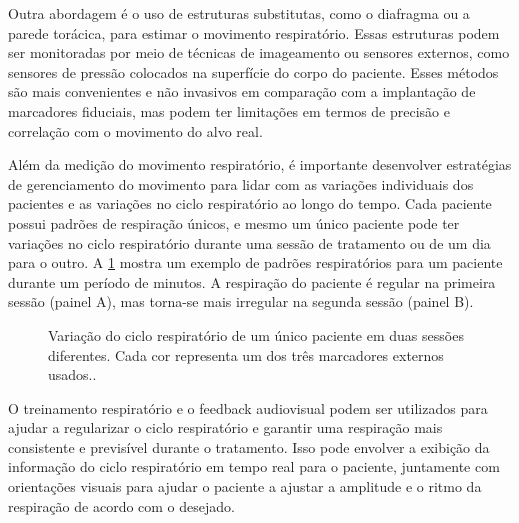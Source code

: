 \documentclass[11pt,a4paper]{article}
\newcounter{exemplo}
\begin{document}
	Outra abordagem é o uso de estruturas substitutas, como o diafragma ou a parede torácica, para estimar o movimento respiratório. Essas estruturas podem ser monitoradas por meio de técnicas de imageamento ou sensores externos, como sensores de pressão colocados na superfície do corpo do paciente. Esses métodos são mais convenientes e não invasivos em comparação com a implantação de marcadores fiduciais, mas podem ter limitações em termos de precisão e correlação com o movimento do alvo real.

	Além da medição do movimento respiratório, é importante desenvolver estratégias de gerenciamento do movimento para lidar com as variações individuais dos pacientes e as variações no ciclo respiratório ao longo do tempo. Cada paciente possui padrões de respiração únicos, e mesmo um único paciente pode ter variações no ciclo respiratório durante uma sessão de tratamento ou de um dia para o outro. A \ref{fig:gmrVariacoesNoCiclo} mostra um exemplo de padrões respiratórios para um paciente durante um período de minutos. A respiração do paciente é regular na primeira sessão (painel A), mas torna-se mais irregular na segunda sessão (painel B).

	\begin{figure}[h]
		\centering
		\caption{Variação do ciclo respiratório de um único paciente em duas sessões diferentes. Cada cor representa um dos três marcadores externos usados..}
		\label{fig:gmrVariacoesNoCiclo}
	\end{figure}

	O treinamento respiratório e o feedback audiovisual podem ser utilizados para ajudar a regularizar o ciclo respiratório e garantir uma respiração mais consistente e previsível durante o tratamento. Isso pode envolver a exibição da informação do ciclo respiratório em tempo real para o paciente, juntamente com orientações visuais para ajudar o paciente a ajustar a amplitude e o ritmo da respiração de acordo com o desejado.
\end{document}
